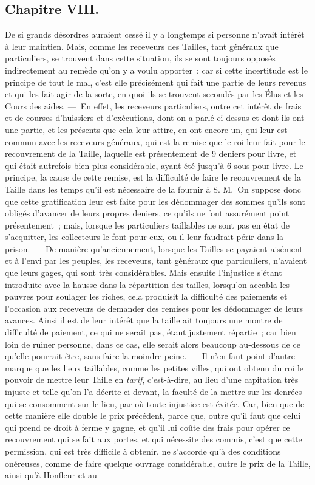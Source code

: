 \documentclass[french,twoside]{book} %
\begin{document}
\subsection[{Chapitre VIII.}]{Chapitre VIII.}
\noindent De si grands désordres auraient cessé il y a longtemps si personne n’avait intérêt à leur maintien. Mais, comme les receveurs des Tailles, tant généraux que particuliers, se trouvent dans cette situation, ils se sont toujours opposés indirectement au remède qu’on y a voulu apporter ; car si cette incertitude est le principe de tout le mal, c’est elle précisément qui fait une partie de leurs revenus et qui les fait agir de la sorte, en quoi ils se trouvent secondés par les Élus et les Cours des aides. — En effet, les receveurs particuliers, outre cet intérêt de frais et de courses d’huissiers et d’exécutions, dont on a parlé ci-dessus et dont ils ont une partie, et les présents que cela leur attire, en ont encore un, qui leur est commun avec les receveurs généraux, qui est la remise que le roi leur fait pour le recouvrement de la Taille, laquelle est présentement de 9 deniers pour livre, et qui était autrefois bien plus considérable, ayant été jusqu’à 6 sous pour livre. Le principe, la cause de cette remise, est la difficulté de faire le recouvrement de la Taille dans les temps qu’il est nécessaire de la fournir à S. M. On suppose donc que cette gratification leur est faite pour les dédommager des sommes qu’ils sont obligés d’avancer de leurs propres deniers, ce qu’ils ne font assurément point présentement ; mais, lorsque les particuliers taillables ne sont pas en état de s’acquitter, les collecteurs le font pour eux, ou il leur faudrait périr dans la prison. — De manière qu’anciennement, lorsque les Tailles se payaient aisément et à l’envi par les peuples, les receveurs, tant généraux que particuliers, n’avaient que leurs gages, qui sont très considérables. Mais ensuite l’injustice s’étant introduite avec la hausse dans la répartition des tailles, lorsqu’on accabla les pauvres pour soulager les riches, cela produisit la difficulté des paiements et l’occasion aux receveurs de demander des remises pour les dédommager de leurs avances. Ainsi il est de leur intérêt que la taille ait toujours une montre de difficulté de paiement, ce qui ne serait pas, étant justement répartie ; car bien loin de ruiner personne, dans ce cas, elle serait alors beaucoup au-dessous de ce qu’elle pourrait être, sans faire la moindre peine. — Il n’en faut point d’autre marque que les lieux taillables, comme les petites villes, qui ont obtenu du roi le pouvoir de mettre leur Taille en {\itshape tarif}, c’est-à-dire, au lieu d’une capitation très injuste et telle qu’on l’a décrite ci-devant, la faculté de la mettre sur les denrées qui se consomment sur le lieu, par où toute injustice est évitée. Car, bien que de cette manière elle double le prix précédent, parce que, outre qu’il faut que celui qui prend ce droit à ferme y gagne, et qu’il lui coûte des frais pour opérer ce recouvrement qui se fait aux portes, et qui nécessite des commis, c’est que cette permission, qui est très difficile à obtenir, ne s’accorde qu’à des conditions onéreuses, comme de faire quelque ouvrage considérable, outre le prix de la Taille, ainsi qu’à Honfleur et au 
\end{document}
